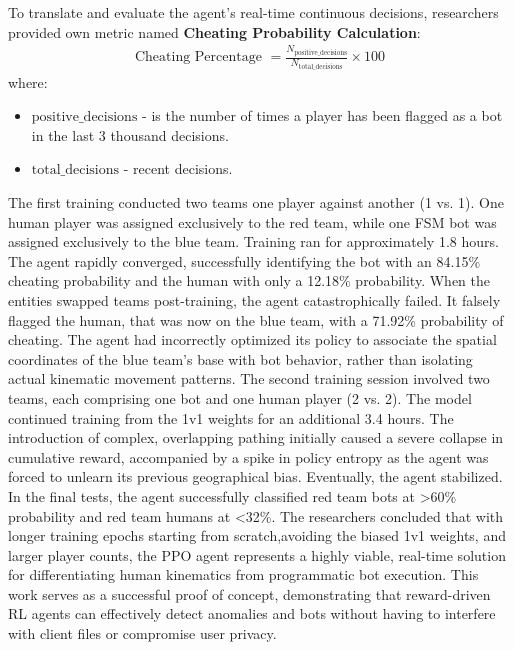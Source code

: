 To translate and evaluate the agent's real-time continuous decisions, researchers provided own metric named \textbf{Cheating Probability Calculation}:
\begin{align}
	\text{Cheating Percentage } = \frac{N_{\text{positive\_decisions}}}{N_{\text{total\_decisions}}} \times 100
\end{align}
where:
\begin{itemize}
	\item $\text{positive\_decisions}$ - is the number of times a player has been flagged as a bot in the last 3 thousand decisions.
	\item $\text{total\_decisions}$ - recent decisions.
\end{itemize}
The first training conducted two teams one player against another (1 vs. 1). One human player was assigned exclusively to the red team, while one FSM bot was assigned exclusively to the blue team. Training ran for approximately 1.8 hours. The agent rapidly converged, successfully identifying the bot with an 84.15\% cheating probability and the human with only a 12.18\% probability. When the entities swapped teams post-training, the agent catastrophically failed. It falsely flagged the human, that was now on the blue team, with a 71.92\% probability of cheating. The agent had incorrectly optimized its policy to associate the spatial coordinates of the blue team's base with bot behavior, rather than isolating actual kinematic movement patterns.
The second training session involved two teams, each comprising one bot and one human player (2 vs. 2). The model continued training from the 1v1 weights for an additional 3.4 hours. The introduction of complex, overlapping pathing initially caused a severe collapse in cumulative reward, accompanied by a spike in policy entropy as the agent was forced to unlearn its previous geographical bias. Eventually, the agent stabilized. In the final tests, the agent successfully classified red team bots at >60\% probability and red team humans at <32\%. The researchers concluded that with longer training epochs starting from scratch,avoiding the biased 1v1 weights, and larger player counts, the PPO agent represents a highly viable, real-time solution for differentiating human kinematics from programmatic bot execution. This work serves as a successful proof of concept, demonstrating that reward-driven RL agents can effectively detect anomalies and bots without having to interfere with client files or compromise user privacy.

